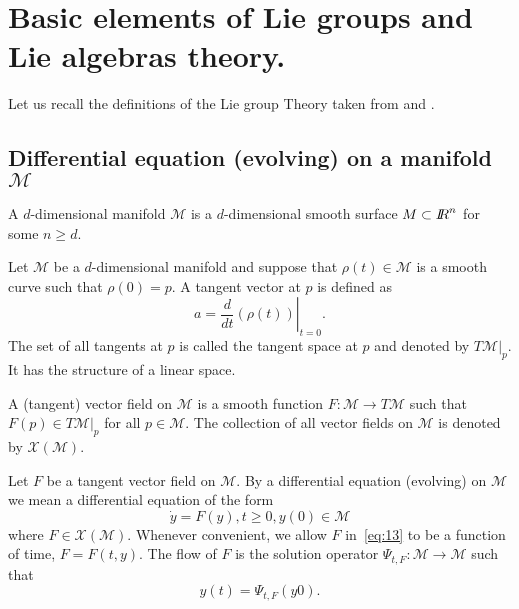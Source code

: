 \section{Basic elements of  Lie groups and Lie algebras theory.}
Let us recall the definitions of the  Lie group Theory taken from \cite{Iserles.ea_AN2000} and \cite{Varadarajan_book1984}.




\subsection{Differential equation (evolving) on a manifold $\mathcal M$}
\begin{definition}
 A $d$-dimensional manifold $\mathcal M$ is a $d$-dimensional smooth surface $ M\subset \mbox{\rm $I\!\!R$}^n$ for some $n\geq d$.
\end{definition}
\begin{definition}
  Let $\mathcal M$ be a $d$-dimensional manifold and suppose that $\rho(t) \in\mathcal M$  is a smooth curve such that $\rho(0) = p$. A tangent vector at $p$ is defined as
  \begin{equation}
    \label{eq:12}
    a = \left. \frac{d}{dt} (\rho(t)) \right|_{t=0}.
  \end{equation}
The set of all tangents at $p$ is called the tangent space at $p$ and denoted by $T\mathcal M|_p$. It has the structure of a linear space. 
\end{definition}
\begin{definition}
   A (tangent) vector field on $\mathcal M$ is a smooth function $F : \mathcal M \rightarrow T\mathcal M$ such that $F (p) \in T\mathcal M|_p$ for all $p \in \mathcal M$. The collection of all vector fields on $\mathcal M$ is denoted by $\mathcal X(\mathcal M)$.
 \end{definition}


 \begin{definition}
   Let $F$ be a tangent vector field on $\mathcal M$. By a differential equation (evolving) on $\mathcal M$ we mean a differential equation of the form
   \begin{equation}
     \dot y =F(y), t\geq  0, y(0)\in \mathcal M\label{eq:13}
   \end{equation}
   where $F \in \mathcal X(\mathcal M)$. Whenever convenient, we allow $F$ in~\eqref{eq:13} to be a function of time, $F = F(t,y)$. The flow of $F$ is the solution operator $\Psi_{t,F} : \mathcal M \rightarrow  \mathcal M$ such that
   \begin{equation}
     y(t) = \Psi_{t,F} (y0).\label{eq:14}
   \end{equation}
 \end{definition}

